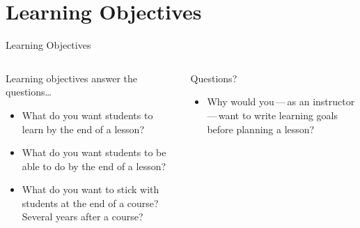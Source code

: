 \documentclass[10pt, aspectratio=169, t]{beamer}
\begin{document}
\section{Learning Objectives}
\begin{frame}{Learning Objectives}
\begin{columns}
\begin{column}{0.5\textwidth}
	\begin{block}{Learning objectives}
		answer the questions\ldots
		\begin{itemize}
			\item What do you want students to \alert{learn} by the end of a lesson?
			\item What do you want students to be able to \alert{do} by the end of a lesson?
			\item What do you want to \alert{stick} with students at the end of a course? Several years after a course?
		\end{itemize}
	\end{block}
\end{column}
\begin{column}{0.5\textwidth}  %
	\pause
	\begin{block}{Questions?}
		\large
		\begin{itemize}
			\item Why would you\,---\,as an instructor\,---\,want to write learning goals before planning a lesson?
		\end{itemize}
	\end{block}
\end{column}
\end{columns}
\end{frame}
\end{document}
